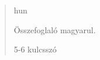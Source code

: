 \begin{abstract}
    \markboth{\abstractname}{}
\begin{scontents}[store-env=lang]
hun
\end{scontents}
\begin{scontents}[store-env=abstracts,print-env=true]
Összefoglaló magyarul.
\end{scontents}

\begin{scontents}[store-env=keywords,print-env=true]
5-6 kulcsszó
\end{scontents}
\end{abstract}
\cleardoublepage
{}
